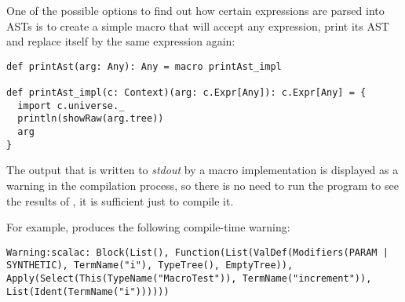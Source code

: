 
One of the possible options to find out how certain expressions are parsed into ASTs is to create a simple macro that will accept any expression, print its AST and replace itself by the same expression again:

\lstset{style=Scala}
\begin{lstlisting}
def printAst(arg: Any): Any = macro printAst_impl

def printAst_impl(c: Context)(arg: c.Expr[Any]): c.Expr[Any] = {
  import c.universe._
  println(showRaw(arg.tree))
  arg
}
\end{lstlisting}

The output that is written to \textit{stdout} by a macro implementation is displayed as a warning in the compilation process, so there is no need to run the program to see the results of , it is sufficient just to compile it.

For example,  produces the following compile-time warning:

\lstset{style=Dump}
\begin{lstlisting}
Warning:scalac: Block(List(), Function(List(ValDef(Modifiers(PARAM | SYNTHETIC), TermName("i"), TypeTree(), EmptyTree)), Apply(Select(This(TypeName("MacroTest")), TermName("increment")), List(Ident(TermName("i"))))))
\end{lstlisting}


